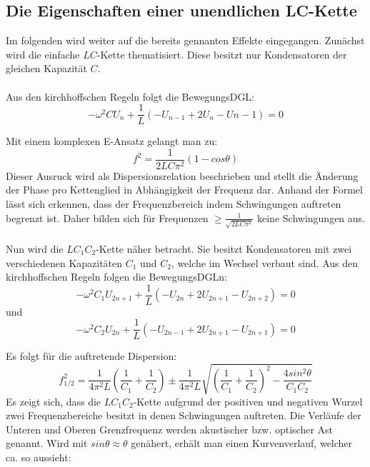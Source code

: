 \subsection{Die Eigenschaften einer unendlichen LC-Kette}


Im folgenden wird weiter auf die bereits gennanten Effekte eingegangen. Zunächst
 wird die einfache $LC$-Kette thematisiert. Diese besitzt nur Kondensatoren der
 gleichen Kapazität $C$.\\\\

Aus den kirchhoffschen Regeln folgt die BewegungsDGL:
\begin{equation}
- \omega ^2 C U_n + \frac{1}{L} \left( -U_{n-1} + 2U_ n -U{n-1} \right) = 0
\end{equation}

Mit einem komplexen E-Ansatz gelangt man zu:
\begin{equation}
 f ^2 = \frac{1}{2LC\pi^2}(1-cos\theta)
\end{equation}
Dieser Ausruck wird als Dispersionsrelation beschrieben und stellt die Änderung
 der Phase pro Kettenglied in Abhängigkeit der Frequenz dar. Anhand der Formel lässt sich erkennen,
  dass der Frequenzbereich indem Schwingungen auftreten begrenzt ist. Daher bilden sich
   für Frequenzen $\geq \frac{1}{\sqrt{2LC\pi^2}}$ keine Schwingungen aus.\\\\

 Nun wird die $LC_1C_2$-Kette näher betracht. Sie besitzt Kondensatoren mit zwei
  verschiedenen Kapazitäten $C_1$ und $C_2$, welche im Wechsel verbaut sind.
 Aus den kirchhoffschen Regeln folgen die BewegungsDGLn:
 \begin{equation}
   -\omega^2 C_1 U_{2n+1} + \frac{1}{L} \left( -U_{2n} + 2U_{2n+1} - U_{2n+2} \right) = 0
 \end{equation}
 und
 \begin{equation}
   -\omega^2 C_2 U_{2n} + \frac{1}{L} \left( -U_{2n-1} + 2U_{2n+1} - U_{2n+1} \right) = 0
 \end{equation}

Es folgt für die auftretende Dispersion:
\begin{equation}
  f_{1/2}^2 = \frac{1}{4\pi^2L}\left(\frac{1}{C_1}+\frac{1}{C_2}\right) \pm \frac{1}{4\pi^2L}\sqrt{\left(\frac{1}{C_1}+\frac{1}{C_2} \right)^2 - \frac{4 sin^2\theta}{C_1C_2}}
\end{equation}
Es zeigt sich, dass die $LC_1C_2$-Kette aufgrund der positiven und negativen Wurzel
zwei Frequenzbereiche besitzt in denen Schwingungen auftreten. Die Verläufe der Unteren und Oberen
 Grenzfrequenz werden akustischer bzw. optischer Ast genannt. Wird mit
$sin \theta \approx \theta$ genähert, erhält man einen Kurvenverlauf, welcher ca. so aussieht:

